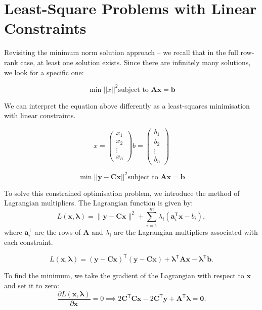 \section{Least-Square Problems with Linear Constraints}
Revisiting the minimum norm solution approach – we recall that in the full row-rank case, at least one solution exists. Since there are infinitely many solutions, we look for a specific one:

\[\min||x||^2 \text{subject to } \textbf{Ax}=\textbf{b}\]

We can interpret the equation above differently as a least-squares minimisation with linear constraints.

\[x=\begin{pmatrix}
    x_1\\x_2\\ \vdots \\ x_n
\end{pmatrix}
b=\begin{pmatrix}
    b_1\\b_2\\ \vdots \\ b_n
\end{pmatrix}
\]


\[\min||\textbf{y}-\textbf{Cx}||^2 \text{subject to } \textbf{Ax}=\textbf{b}\]

To solve this constrained optimisation problem, we introduce the method of Lagrangian multipliers. The Lagrangian function is given by:
\[
L(\mathbf{x}, \boldsymbol{\lambda}) = \|\mathbf{y} - \mathbf{C}\mathbf{x}\|^2 + \sum_{i=1}^{m} \lambda_i (\mathbf{a}_i^\mathsf{T}\mathbf{x} - b_i),
\]
where $\mathbf{a}_i^\mathsf{T}$ are the rows of $\mathbf{A}$ and $\lambda_i$ are the Lagrangian multipliers associated with each constraint.

\[
L(\mathbf{x}, \boldsymbol{\lambda}) = (\mathbf{y} - \mathbf{C}\mathbf{x})^\mathsf{T}(\mathbf{y} - \mathbf{C}\mathbf{x}) + \boldsymbol{\lambda}^\mathsf{T}\mathbf{A}\mathbf{x} - \boldsymbol{\lambda}^\mathsf{T}\mathbf{b}.
\]


To find the minimum, we take the gradient of the Lagrangian with respect to $\mathbf{x}$ and set it to zero:
\[
\frac{\partial L(\mathbf{x}, \boldsymbol{\lambda})}{\partial \mathbf{x}} = 0 \implies 2\mathbf{C}^\mathsf{T}\mathbf{C}\mathbf{x} - 2\mathbf{C}^\mathsf{T}\mathbf{y} + \mathbf{A}^\mathsf{T}\boldsymbol{\lambda}=\mathbf{0}.
\]

